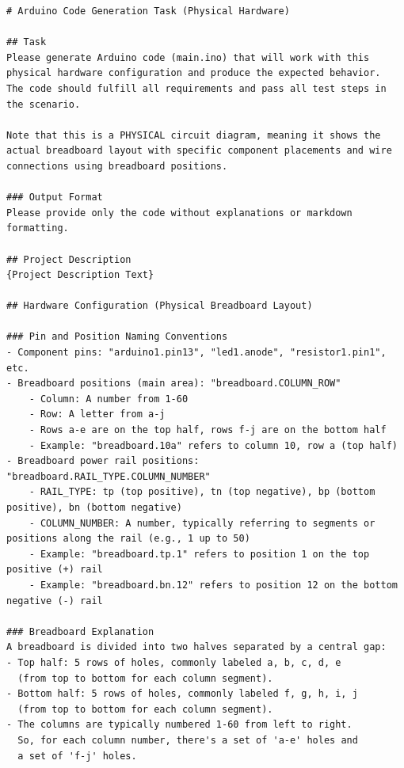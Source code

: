 \documentclass{article} %
\newlength{\promptboxmargin}
\begin{document}
\begin{adjustwidth}{\promptboxmargin}{\promptboxmargin}
\begin{lstlisting}[style=promptstyle, caption={Code Generation Task (Physical Hardware)}, basicstyle=\ttfamily\footnotesize]
# Arduino Code Generation Task (Physical Hardware)

## Task
Please generate Arduino code (main.ino) that will work with this physical hardware configuration and produce the expected behavior.
The code should fulfill all requirements and pass all test steps in the scenario.

Note that this is a PHYSICAL circuit diagram, meaning it shows the actual breadboard layout with specific component placements and wire connections using breadboard positions.

### Output Format
Please provide only the code without explanations or markdown formatting.

## Project Description
{Project Description Text}

## Hardware Configuration (Physical Breadboard Layout)

### Pin and Position Naming Conventions
- Component pins: "arduino1.pin13", "led1.anode", "resistor1.pin1", etc.
- Breadboard positions (main area): "breadboard.COLUMN_ROW"
    - Column: A number from 1-60
    - Row: A letter from a-j
    - Rows a-e are on the top half, rows f-j are on the bottom half
    - Example: "breadboard.10a" refers to column 10, row a (top half)
- Breadboard power rail positions: "breadboard.RAIL_TYPE.COLUMN_NUMBER"
    - RAIL_TYPE: tp (top positive), tn (top negative), bp (bottom positive), bn (bottom negative)
    - COLUMN_NUMBER: A number, typically referring to segments or positions along the rail (e.g., 1 up to 50)
    - Example: "breadboard.tp.1" refers to position 1 on the top positive (+) rail
    - Example: "breadboard.bn.12" refers to position 12 on the bottom negative (-) rail

### Breadboard Explanation
A breadboard is divided into two halves separated by a central gap:
- Top half: 5 rows of holes, commonly labeled a, b, c, d, e
  (from top to bottom for each column segment).
- Bottom half: 5 rows of holes, commonly labeled f, g, h, i, j
  (from top to bottom for each column segment).
- The columns are typically numbered 1-60 from left to right.
  So, for each column number, there's a set of 'a-e' holes and
  a set of 'f-j' holes.


\end{lstlisting}
\end{adjustwidth}
\end{document}
